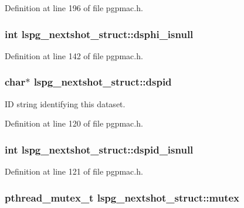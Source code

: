 Definition at line 196 of file pgpmac.h.\hypertarget{structlspg__nextshot__struct_a2d1f51cb1bb575a214344773136be878}{
\subsubsection[{dsphi\_\-isnull}]{\setlength{\rightskip}{0pt plus 5cm}int {\bf lspg\_\-nextshot\_\-struct::dsphi\_\-isnull}}}
\label{structlspg__nextshot__struct_a2d1f51cb1bb575a214344773136be878}


Definition at line 142 of file pgpmac.h.\hypertarget{structlspg__nextshot__struct_a4487e718c2b55a8ab9ebb18329574ae1}{
\subsubsection[{dspid}]{\setlength{\rightskip}{0pt plus 5cm}char$\ast$ {\bf lspg\_\-nextshot\_\-struct::dspid}}}
\label{structlspg__nextshot__struct_a4487e718c2b55a8ab9ebb18329574ae1}


ID string identifying this dataset. 

Definition at line 120 of file pgpmac.h.\hypertarget{structlspg__nextshot__struct_a7665485395487756ab448d0c81c84d10}{
\subsubsection[{dspid\_\-isnull}]{\setlength{\rightskip}{0pt plus 5cm}int {\bf lspg\_\-nextshot\_\-struct::dspid\_\-isnull}}}
\label{structlspg__nextshot__struct_a7665485395487756ab448d0c81c84d10}


Definition at line 121 of file pgpmac.h.\hypertarget{structlspg__nextshot__struct_a38b657155fbee9b73278f76912cf2333}{
\subsubsection[{mutex}]{\setlength{\rightskip}{0pt plus 5cm}pthread\_\-mutex\_\-t {\bf lspg\_\-nextshot\_\-struct::mutex}}}
\label{structlspg__nextshot__struct_a38b657155fbee9b73278f76912cf2333}



